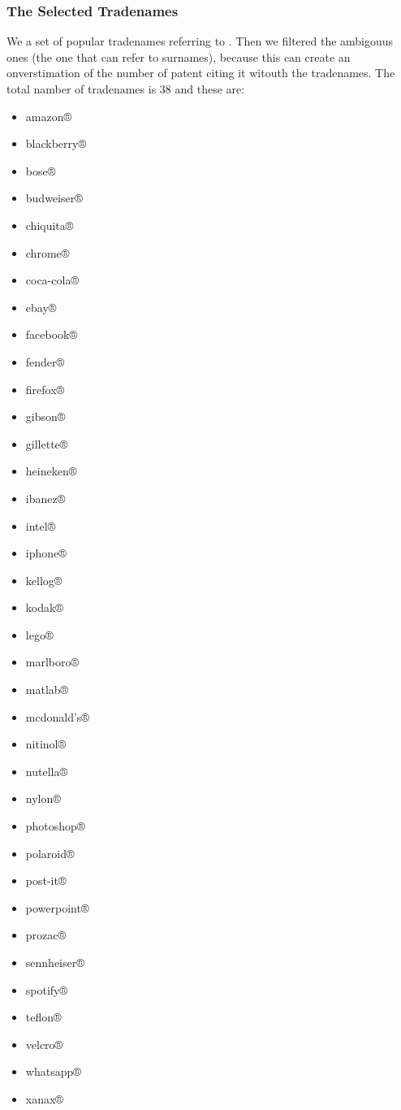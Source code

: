 \documentclass[]{book}
\providecommand{\tightlist}{%
  \setlength{\itemsep}{0pt}\setlength{\parskip}{0pt}}
\begin{document}
\subsubsection*{The Selected Tradenames}\label{the-selected-tradenames}

We a set of popular tradenames referring to
\citep{morris2016trademarks}. Then we filtered the ambigouus ones (the
one that can refer to surnames), because this can create an
onverstimation of the number of patent citing it witouth the tradenames.
The total namber of tradenames is 38 and these are:

\begin{itemize}
\tightlist
\item
  amazon®
\item
  blackberry®
\item
  bose®
\item
  budweiser®
\item
  chiquita®
\item
  chrome®
\item
  coca-cola®
\item
  ebay®
\item
  facebook®
\item
  fender®
\item
  firefox®
\item
  gibson®
\item
  gillette®
\item
  heineken®
\item
  ibanez®
\item
  intel®
\item
  iphone®
\item
  kellog®
\item
  kodak®
\item
  lego®
\item
  marlboro®
\item
  matlab®
\item
  mcdonald's®
\item
  nitinol®
\item
  nutella®
\item
  nylon®
\item
  photoshop®
\item
  polaroid®
\item
  post-it®
\item
  powerpoint®
\item
  prozac®
\item
  sennheiser®
\item
  spotify®
\item
  teflon®
\item
  velcro®
\item
  whatsapp®
\item
  xanax®
\end{itemize}
\end{document}
